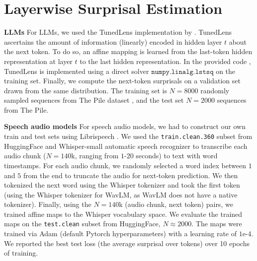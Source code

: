 \documentclass{article}
\theoremstyle{plain}
\theoremstyle{definition}
\theoremstyle{remark}
\newcommand{\mypar}[1]{\textbf{#1}\quad}
\begin{document}


\section{Layerwise Surprisal Estimation}
\label{app:tunedlens}
\setcounter{figure}{0}    
\setcounter{table}{0} 

\mypar{LLMs} For LLMs, we used the TunedLens \citep{Belrose2023ElicitingLP} implementation by \citet{ghandeharioun_patchscope}. TunedLens ascertains the amount of information (linearly) encoded in hidden layer $t$ about the next token. To do so, an affine mapping is learned from the last-token hidden representation at layer $t$ to the last hidden representation. In the provided code \citep{ghandeharioun_patchscope}, TunedLens is implemented using a direct solver $\texttt{numpy.linalg.lstsq}$ on the training set. Finally, we compute the next-token surprisals on a validation set drawn from the same distribution. The training set is $N=8000$ randomly sampled sequences from The Pile dataset \citep{gao2020pile}, and the test set $N=2000$ sequences from The Pile. 

\mypar{Speech audio models} For speech audio models, we had to construct our own train and test sets using Librispeech \citep{librispeech}. We used the \texttt{train.clean.360} subset from HuggingFace and Whisper-small automatic speech recognizer to transcribe each audio chunk ($N=140$k, ranging from $1$-$20$ seconds) to text with word timestamps. For each audio chunk, we randomly selected a word index between $1$ and $5$ from the end to truncate the audio for next-token prediction. We then tokenized the next word using the Whisper tokenizer and took the first token (using the Whisper tokenizer for WavLM, as WavLM does not have a native tokenizer). Finally, using the $N=140$k (audio chunk, next token) pairs, we trained affine maps to the Whisper vocabulary space. We evaluate the trained maps on the \texttt{test.clean} subset from HuggingFace, $N\approx2000$. The maps were trained via Adam (default Pytorch hyperparameters) with a learning rate of $1$e-4. We reported the best test loss (the average surprisal over tokens) over 10 epochs of training.
\end{document}
